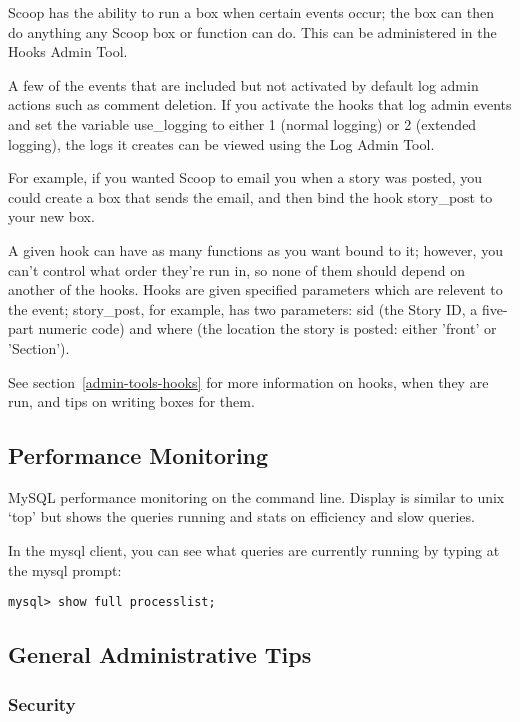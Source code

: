 Scoop has the ability to run a box when certain events occur; the box can then do anything any Scoop box or function can do.  This can be administered in the Hooks Admin Tool.

A few of the events that are included but not activated by default log admin actions such as comment deletion.  If you activate the hooks that log admin events and set the variable use\_logging to either 1 (normal logging) or 2 (extended logging), the logs it creates can be viewed using the Log Admin Tool.

For example, if you wanted Scoop to email you when a story was posted, you could create a box that sends the email, and then bind the hook story\_post to your new box.

A given hook can have as many functions as you want bound to it; however, you can't control what order they're run in, so none of them should depend on another of the hooks. Hooks are given specified parameters which are relevent to the event; story\_post, for example, has two parameters: sid (the Story ID, a five-part numeric code) and where (the location the story is posted: either 'front' or 'Section').

See section~\ref{admin-tools-hooks} for more information on hooks, when they are run, and tips on writing boxes for them.

\subsection{Performance Monitoring}
\label{performance}

 MySQL performance monitoring on the command line. Display is similar to unix `top' but shows the queries running and stats on efficiency and slow queries.

In the mysql client, you can see what queries are currently running by typing at the mysql prompt:
\begin{verbatim}
mysql> show full processlist;
\end{verbatim}


\subsection{General Administrative Tips}
\label{admin-general}

\subsubsection{Security}

